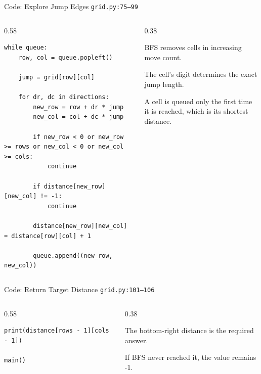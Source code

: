 \documentclass[aspectratio=169,11pt]{beamer}
\begin{document}
\begin{frame}[fragile]{Code: Explore Jump Edges}
\scriptsize
{} \texttt{grid.py:75--99}

\vspace{0.08cm}
\begin{columns}[T,totalwidth=\textwidth]
\begin{column}{0.58\textwidth}
\begin{lstlisting}[style=cpcode]
while queue:
    row, col = queue.popleft()

    jump = grid[row][col]

    for dr, dc in directions:
        new_row = row + dr * jump
        new_col = col + dc * jump

        if new_row < 0 or new_row >= rows or new_col < 0 or new_col >= cols:
            continue

        if distance[new_row][new_col] != -1:
            continue

        distance[new_row][new_col] = distance[row][col] + 1

        queue.append((new_row, new_col))
\end{lstlisting}
\end{column}
\begin{column}{0.38\textwidth}
\begin{tightitemize}
  \item BFS removes cells in increasing move count.
  \item The cell's digit determines the exact jump length.
  \item A cell is queued only the first time it is reached, which is its shortest distance.
\end{tightitemize}
\end{column}
\end{columns}
\end{frame}

\begin{frame}[fragile]{Code: Return Target Distance}
\scriptsize
{} \texttt{grid.py:101--106}

\vspace{0.08cm}
\begin{columns}[T,totalwidth=\textwidth]
\begin{column}{0.58\textwidth}
\begin{lstlisting}[style=cpcode]
    print(distance[rows - 1][cols - 1])

main()
\end{lstlisting}
\end{column}
\begin{column}{0.38\textwidth}
\begin{tightitemize}
  \item The bottom-right distance is the required answer.
  \item If BFS never reached it, the value remains -1.
\end{tightitemize}
\end{column}
\end{columns}
\end{frame}
\end{document}
